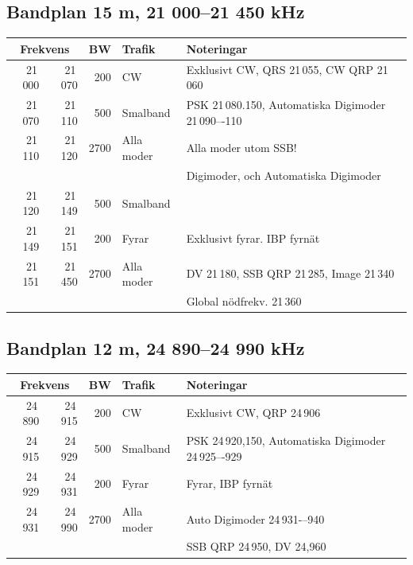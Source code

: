 \subsection*{Bandplan 15 m, 21 000--21 450 kHz}
\begin{tabular}{rrrll}
\multicolumn{2}{c}{\textbf{Frekvens}} & \textbf{BW} & \textbf{Trafik} & \textbf{Noteringar} \\ \hline

21\,000 & 21\,070 & 200  & CW         & Exklusivt CW, QRS 21\,055, CW QRP 21\,060           \\ \hline
21\,070 & 21\,110 & 500  & Smalband   & PSK 21\,080.150, Automatiska Digimoder 21\,090–-110 \\
21\,110 & 21\,120 & 2700 & Alla moder & Alla moder utom SSB!                                \\
        &         &      &            & Digimoder, och Automatiska Digimoder                \\ \hline
21\,120 & 21\,149 & 500  & Smalband   &                                                     \\ \hline
21\,149 & 21\,151 & 200  & Fyrar      & Exklusivt fyrar. IBP fyrnät                         \\ \hline
21\,151 & 21\,450 & 2700 & Alla moder & DV 21\,180, SSB QRP 21\,285, Image 21\,340          \\
        &         &      &            & Global nödfrekv. 21\,360                            \\ \hline
\end{tabular}

\subsection*{Bandplan 12 m, 24 890--24 990 kHz}
\begin{tabular}{rrrll}
\multicolumn{2}{c}{\textbf{Frekvens}} & \textbf{BW} & \textbf{Trafik} & \textbf{Noteringar} \\ \hline
24\,890 & 24\,915 & 200  & CW         & Exklusivt CW, QRP 24\,906                             \\ \hline
24\,915 & 24\,929 & 500  & Smalband   & PSK 24\,920,150, Automatiska Digimoder 24\,925–-929 \\ \hline
24\,929 & 24\,931 & 200  & Fyrar      & Fyrar, IBP fyrnät                                    \\ \hline
24\,931 & 24\,990 & 2700 & Alla moder & Auto Digimoder 24\,931-–940                        \\
       &        &      &            & SSB QRP 24\,950, DV 24,960                            \\ \hline
\end{tabular}

